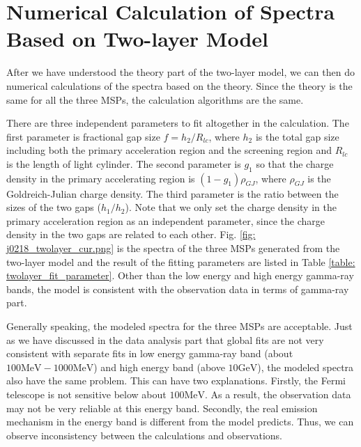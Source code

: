 \documentclass[12pt]{report}
\begin{document}
        \section{Numerical Calculation of Spectra Based on Two-layer Model}
          After we have understood the theory part of the two-layer model, 
          we can then do numerical calculations of the spectra 
          based on the theory. Since the theory is the same for all the three MSPs, the calculation 
          algorithms are the same. 

          There are three independent parameters to fit altogether in the calculation. 
          The first parameter is fractional gap size $f=h_{2}/R_{lc}$, where $h_{2}$ is the 
          total gap size including both the primary acceleration region and the screening region 
          and $R_{lc}$ is the length of light cylinder. The second parameter is $g_{1}$ so that
          the charge density in the primary accelerating region is $\left(1-g_{1}\right) \rho_{GJ}$, 
          where $\rho_{GJ}$ is the Goldreich-Julian charge density. The third parameter is the ratio 
          between the sizes of the two gaps ($h_{1}/h_{2}$). Note that we only set the charge density in the primary acceleration region as an 
          independent parameter, since the charge density in the two gaps are related to each 
          other. Fig. \ref{fig: j0218_twolayer_cur.png} is the spectra of the three MSPs generated
          from the two-layer model and the result of the fitting parameters are listed in Table 
          \ref{table: twolayer_fit_parameter}. Other than the low energy and high energy gamma-ray bands, 
          the model is consistent with the observation data in terms of gamma-ray part. 

          Generally speaking, the modeled spectra for the three MSPs are acceptable. Just as 
          we have discussed in the data analysis part that global fits are not very consistent 
          with separate fits in low energy gamma-ray band (about $100\mbox{MeV} - 1000\mbox{MeV}$) and high energy
          band (above $10 \mbox{GeV}$), the modeled spectra also have the same problem. 
          This can have two explanations. Firstly, the Fermi telescope is not sensitive below 
          about $100 \mbox{MeV}$. As a result, the observation data may not be very reliable at  
          this energy band. Secondly, the real emission mechanism in the energy band is different 
          from the model predicts. Thus, we can observe inconsistency between the calculations 
          and observations.
 
\end{document}
